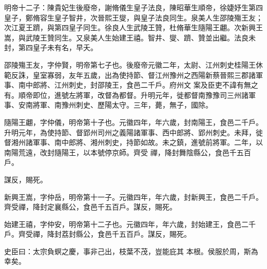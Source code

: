 
\begin{pinyinscope}

 明帝十二子：陳貴妃生後廢帝，謝脩儀生皇子法良，陳昭華生順帝，徐婕妤生第四皇子，鄭脩容生皇子智井，次晉熙王燮，與皇子法良同生。泉美人生邵陵殤王友；
 次江夏王躋，與第四皇子同生。徐良人生武陵王贊，杜脩華生隨陽王翽。次新興王嵩，與武陵王贊同生。又泉美人生始建王禧。智井、燮、躋、贊並出繼。法良未封，第四皇子未有名，早夭。



 邵陵殤王友，字仲賢，明帝第七子也。後廢帝元徽二年，太尉、江州刺史桂陽王休範反誅，皇室寡弱，友年五歲，出為使持節、督江州豫州之西陽新蔡晉熙三郡諸軍事、南中郎將、江州刺史，封邵陵王，食邑二千戶。府州文
 案及臣吏不諱有無之有。順帝即位，進號左將軍，改督為都督。升明元年，徙都督南豫豫司三州諸軍事、安南將軍、南豫州刺史、歷陽太守。三年，薨，無子，國除。



 隨陽王翽，字仲儀，明帝第十子也。元徽四年，年六歲，封南陽王，食邑二千戶。升明元年，為使持節、督郢州司州之義陽諸軍事、西中郎將、郢州刺史。未拜，徙督湘州諸軍事、南中郎將、湘州刺史，持節如故。未之鎮，進號前將軍。二年，以南陽荒遠，改封隨陽王，以本號停京師。齊受
 禪，降封舞陰縣公，食邑千五百戶。



 謀反，賜死。



 新興王嵩，字仲岳，明帝第十一子。元徽四年，年六歲，封新興王，食邑二千戶。齊受禪，降封定襄縣公，食邑千五百戶。謀反，賜死。



 始建王禧，字仲安，明帝第十二子也。元徽四年，年六歲，封始建王，食邑二千戶。齊受禪，降封荔封縣公，食邑千五百戶。謀反，賜死。



 史臣曰：太宗負螟之慶，事非己出，枝葉不茂，豈能庇其
 本根。侯服於周，斯為幸矣。



\end{pinyinscope}